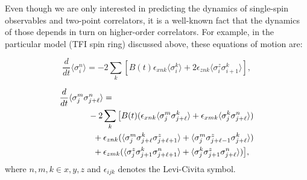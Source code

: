 \documentclass[a4paper,aps,amsmath,amssymb,twocolumn,longbibliography,,accepted=2022-05-17]{quantumarticle}
\begin{document}
Even though we are only interested in predicting the dynamics of single-spin observables and two-point correlators, it is a well-known fact that the dynamics of those depends in turn on higher-order correlators. For example, in the particular model (TFI spin ring) discussed above, these equations of motion are:

\begin{equation}
	\dfrac{d}{dt}  \langle \sigma^n _{i}\rangle=-2 \sum_{k}\left[B(t) \epsilon_{xnk}  \langle \sigma^k_{i} \rangle+2 \epsilon_{znk}  \langle \sigma^z_{i} \sigma^k_{i+1} \rangle\right],
\end{equation}

\begin{align}
	\dfrac{d}{dt}  \langle \sigma^m _{j} \sigma^n _{j+\ell}\rangle=&
	\\
	&\hspace{-1cm}-2\sum_{k}\big[B(t)( \epsilon_{xnk}  \langle \sigma^m_{j} \sigma^k_{j+\ell} \rangle + \epsilon_{xmk}  \langle \sigma^k_{j} \sigma^n_{j+\ell} \rangle)\nonumber
	\\
	&\hspace{-0.8cm}+\epsilon_{znk}(\langle \sigma^m_{j} \sigma^k_{j+\ell}\sigma^z_{j+\ell+1} \rangle+\langle \sigma^m_{j} \sigma^z_{j+\ell-1}\sigma^k_{j+\ell} \rangle)\nonumber
	\\
	&\hspace{-0.8cm}+\epsilon_{zmk}(\langle \sigma^z_{j} \sigma^k_{j+1}\sigma^n_{j+\ell+1} \rangle+\langle \sigma^k_{j} \sigma^z_{j+1}\sigma^n_{j+\ell}\rangle)\big],\nonumber
\end{align}
where $n, m, k \in {x,y,z}$ and $\epsilon_{ijk}$ denotes the Levi-Civita symbol. 
\end{document}
